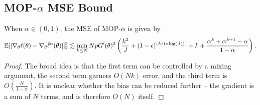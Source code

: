 \subsection{MOP-$\alpha$ MSE Bound}

\begin{thm}
    When $\alpha \in (0,1)$, the MSE of MOP-$\alpha$ is given by
    \begin{equation}
        \mathbb{E}||\nabla_\theta\ell(\theta) - \nabla_\theta \hat\ell^\alpha(\theta)||_2^2 \lesssim \min_{k \leq N} NpG'(\theta)^2\left(\frac{k^2}{J}+(1-\epsilon)^{\lfloor k/(c\log(J)) \rfloor}+k+\frac{\alpha^k  + \alpha^{k+1} - \alpha}{1-\alpha}\right).
    \end{equation}
\end{thm}

\begin{proof}
    
The broad idea is that the first term can be controlled by a mixing argument, the second term garners $O(Nk)$ error, and the third term is $O\left(\frac{N}{1-\alpha}\right)$. It is unclear whether the bias can be reduced further -- the gradient is a sum of $N$ terms, and is therefore $O(N)$ itself. 


\end{proof}
